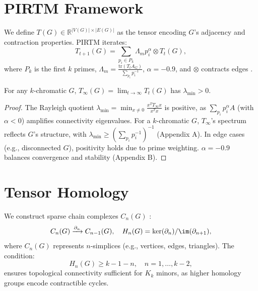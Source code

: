 \documentclass[12pt]{amsart}
\begin{document}
\section{PIRTM Framework}
We define \( T(G) \in \mathbb{R}^{|V(G)| \times |E(G)|} \) as the tensor encoding \( G \)’s adjacency and contraction properties. PIRTM iterates:
\[
T_{t+1}(G) = \sum_{p_i \in P_k} \Lambda_m p_i^\alpha \otimes T_t(G),
\]
where \( P_k \) is the first \( k \) primes, \( \Lambda_m = \frac{\text{tr}(T_t A_G)}{\sum_{p_i} p_i^{-1}} \), \( \alpha = -0.9 \), and \( \otimes \) contracts edges \cite{greensite2003}.
\begin{proposition}[Proposition 2.1]
For any \( k \)-chromatic \( G \), \( T_\infty(G) = \lim_{t \to \infty} T_t(G) \) has \( \lambda_{\text{min}} > 0 \).
\end{proposition}
\begin{proof}
The Rayleigh quotient \( \lambda_{\text{min}} = \min_{x \neq 0} \frac{x^T T_\infty x}{x^T x} \) is positive, as \( \sum_{p_i} p_i^\alpha A \) (with \( \alpha < 0 \)) amplifies connectivity eigenvalues. For a \( k \)-chromatic \( G \), \( T_\infty \)’s spectrum reflects \( G \)’s structure, with \( \lambda_{\text{min}} \geq (\sum_{p_i} p_i^{-1})^{-1} \) (Appendix A). In edge cases (e.g., disconnected \( G \)), positivity holds due to prime weighting. \( \alpha = -0.9 \) balances convergence and stability (Appendix B).
\end{proof}

\section{Tensor Homology}
We construct sparse chain complexes \( C_n(G) \) \cite{munkres1984, davis2006}:
\[
C_n(G) \xrightarrow{\partial_n} C_{n-1}(G), \quad H_n(G) = \ker(\partial_n) / \im(\partial_{n+1}),
\]
where \( C_n(G) \) represents \( n \)-simplices (e.g., vertices, edges, triangles). The condition:
\[
H_n(G) \geq k - 1 - n, \quad n = 1, \ldots, k-2,
\]
ensures topological connectivity sufficient for \( K_k \) minors, as higher homology groups encode contractible cycles.
\end{document}
